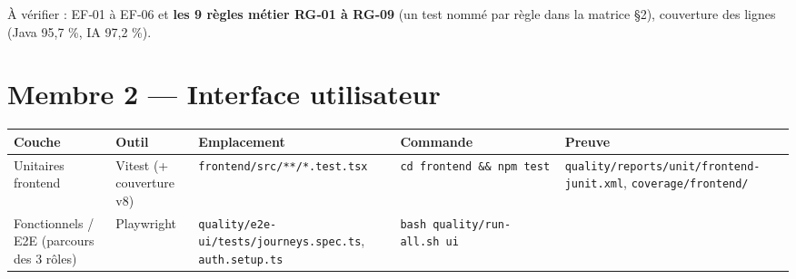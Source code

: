 \documentclass[
  11pt,
]{article}
\begin{document}
À vérifier : EF‑01 à EF‑06 et \textbf{les 9 règles métier RG‑01 à RG‑09}
(un test nommé par règle dans la matrice §2), couverture des lignes
(Java 95,7 \%, IA 97,2 \%).

\section{Membre 2 --- Interface
utilisateur}\label{membre-2--interface-utilisateur}

\begin{longtable}[]{@{}
  >{\raggedright\arraybackslash}p{}
  >{\raggedright\arraybackslash}p{}
  >{\raggedright\arraybackslash}p{}
  >{\raggedright\arraybackslash}p{}
  >{\raggedright\arraybackslash}p{}@{}}
\toprule\noalign{}
\begin{minipage}[b]{\linewidth}\raggedright
Couche
\end{minipage} & \begin{minipage}[b]{\linewidth}\raggedright
Outil
\end{minipage} & \begin{minipage}[b]{\linewidth}\raggedright
Emplacement
\end{minipage} & \begin{minipage}[b]{\linewidth}\raggedright
Commande
\end{minipage} & \begin{minipage}[b]{\linewidth}\raggedright
Preuve
\end{minipage} \\
\midrule\noalign{}
\endhead
\bottomrule\noalign{}
\endlastfoot
Unitaires frontend & Vitest (+ couverture v8) &
\texttt{frontend/}\allowbreak{}\texttt{src/}\allowbreak{}\texttt{**/}\allowbreak{}\texttt{*.}\allowbreak{}\texttt{test.}\allowbreak{}\texttt{tsx}
& \texttt{cd\ frontend\ \&\&\ npm\ test} &
\texttt{quality/}\allowbreak{}\texttt{reports/}\allowbreak{}\texttt{unit/}\allowbreak{}\texttt{frontend-}\allowbreak{}\texttt{junit.}\allowbreak{}\texttt{xml},
\texttt{coverage/frontend/} \\
Fonctionnels / E2E (parcours des 3 rôles) & Playwright &
\texttt{quality/}\allowbreak{}\texttt{e2e-}\allowbreak{}\texttt{ui/}\allowbreak{}\texttt{tests/}\allowbreak{}\texttt{journeys.}\allowbreak{}\texttt{spec.}\allowbreak{}\texttt{ts},
\texttt{auth.setup.ts} &
\texttt{bash\ quality/}\allowbreak{}\texttt{run-}\allowbreak{}\texttt{all.}\allowbreak{}\texttt{sh\ ui}

\end{longtable}
\end{document}
